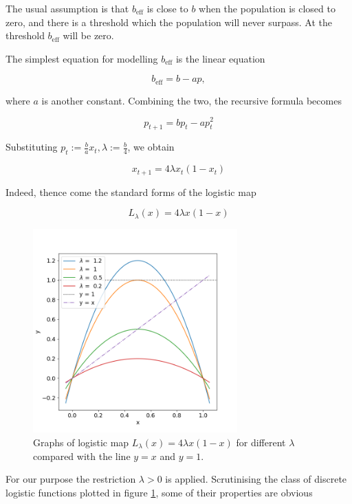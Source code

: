 \documentclass{report}
\theoremstyle{definition}
\theoremstyle{definition}
\theoremstyle{remark}
\newcommand{\be}{b_\text{eff}}
\begin{document}
The usual assumption is that $\be$ is close to $b$ when the population is closed to zero, and there is a threshold which the population will never surpass. At the threshold $\be$ will be zero.

The simplest equation for modelling $\be$ is the linear equation

$$
\be = b - ap,
$$

where $a$ is another constant.
Combining the two, the recursive formula becomes 

$$
p_{t+1}  = b p_t - ap_t^2
$$

Substituting $p_{t} := \frac{b}{a} x_{t}, \lambda := \frac{b}{4}$, we obtain

$$
x_{t+1} = 4 \lambda x_t(1-x_t) 
$$

Indeed, thence come the standard forms of the logistic map

\begin{equation}\label{eq_logistic}
	L_{\lambda}(x) = 4 \lambda x(1-x)
\end{equation}

\begin{figure}[t]
	\centering
	\label{fig:logistic_map_diff_lambda}
	\includegraphics[width=0.7\textwidth]{./figures/logistic_map_diff_lambda.png}
	\caption{Graphs of logistic map $L_{\lambda}(x) = 4 \lambda x(1-x)$ for different $\lambda$ compared with the line $y=x$ and $y = 1$.} 
\end{figure}


For our purpose the restriction $\lambda >0$ is applied.
Scrutinising the class of discrete logistic functions plotted in figure \ref{fig:logistic_map_diff_lambda}, some of their properties are obvious
\end{document}
